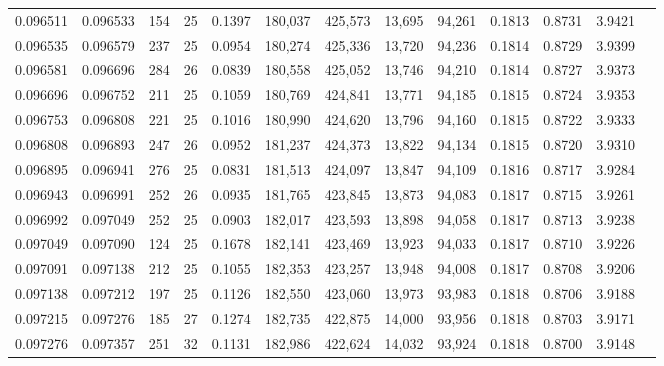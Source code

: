 \begin{tabular}{rrrrrrrrrrrrr}
0.096511 & 0.096533 & 154 &  25 &                                     0.1397 & 180,037 & 425,573 &  13,695 &  94,261 & 0.1813 & 0.8731 & 3.9421 \\
0.096535 & 0.096579 & 237 &  25 &                                     0.0954 & 180,274 & 425,336 &  13,720 &  94,236 & 0.1814 & 0.8729 & 3.9399 \\
0.096581 & 0.096696 & 284 &  26 &                                     0.0839 & 180,558 & 425,052 &  13,746 &  94,210 & 0.1814 & 0.8727 & 3.9373 \\
0.096696 & 0.096752 & 211 &  25 &                                     0.1059 & 180,769 & 424,841 &  13,771 &  94,185 & 0.1815 & 0.8724 & 3.9353 \\
0.096753 & 0.096808 & 221 &  25 &                                     0.1016 & 180,990 & 424,620 &  13,796 &  94,160 & 0.1815 & 0.8722 & 3.9333 \\
0.096808 & 0.096893 & 247 &  26 &                                     0.0952 & 181,237 & 424,373 &  13,822 &  94,134 & 0.1815 & 0.8720 & 3.9310 \\
0.096895 & 0.096941 & 276 &  25 &                                     0.0831 & 181,513 & 424,097 &  13,847 &  94,109 & 0.1816 & 0.8717 & 3.9284 \\
0.096943 & 0.096991 & 252 &  26 &                                     0.0935 & 181,765 & 423,845 &  13,873 &  94,083 & 0.1817 & 0.8715 & 3.9261 \\
0.096992 & 0.097049 & 252 &  25 &                                     0.0903 & 182,017 & 423,593 &  13,898 &  94,058 & 0.1817 & 0.8713 & 3.9238 \\
0.097049 & 0.097090 & 124 &  25 &                                     0.1678 & 182,141 & 423,469 &  13,923 &  94,033 & 0.1817 & 0.8710 & 3.9226 \\
0.097091 & 0.097138 & 212 &  25 &                                     0.1055 & 182,353 & 423,257 &  13,948 &  94,008 & 0.1817 & 0.8708 & 3.9206 \\
0.097138 & 0.097212 & 197 &  25 &                                     0.1126 & 182,550 & 423,060 &  13,973 &  93,983 & 0.1818 & 0.8706 & 3.9188 \\
0.097215 & 0.097276 & 185 &  27 &                                     0.1274 & 182,735 & 422,875 &  14,000 &  93,956 & 0.1818 & 0.8703 & 3.9171 \\
0.097276 & 0.097357 & 251 &  32 &                                     0.1131 & 182,986 & 422,624 &  14,032 &  93,924 & 0.1818 & 0.8700 & 3.9148 \\

\end{tabular}
